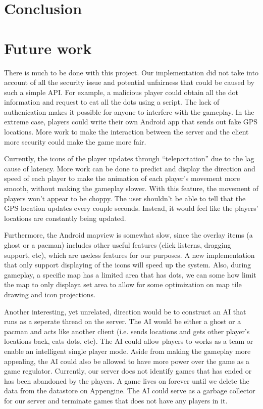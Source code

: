 \documentclass{acm_proc_article-sp}
\begin{document}
\section{Conclusion}

\section{Future work}

There is much to be done with this project. Our implementation did not
take into account of all the security issue and potential unfairness
that could be caused by such a simple API. For example, a malicious
player could obtain all the dot information and request to eat all the
dots using a script. The lack of authenication makes it possible for
anyone to interfere with the gameplay. In the extreme case, players
could write their own Android app that sends out fake GPS
locations. More work to make the interaction between the server and
the client more security could make the game more fair.

Currently, the icons of the player updates through ``teleportation''
due to the lag cause of latency. More work can be done to predict and
display the direction and speed of each player to make the animation
of each player's movement more smooth, without making the gameplay
slower. With this feature, the movement of players won't appear to be
choppy. The user shouldn't be able to tell that the GPS location
updates every couple seconds. Instead, it would feel like the players'
locations are constantly being updated.

Furthermore, the Android mapview is somewhat slow, since the overlay
items (a ghost or a pacman) includes other useful features (click
listerns, dragging support, etc), which are useless features for our
purposes. A new implementation that only support displaying of the
icons will speed up the system. Also, during gameplay, a specific map
has a limited area that has dots, we can some how limit the map to
only displaya set area to allow for some optimization on map tile
drawing and icon projections.

Another interesting, yet unrelated, direction would be to construct an
AI that runs as a seperate thread on the server. The AI would be
either a ghost or a pacman and acts like another client (i.e. sends
locations and gets other player's locations back, eats dots, etc). The
AI could allow players to works as a team or enable an intelligent
single player mode. Aside from making the gameplay more appealing, the
AI could also be allowed to have more power over the game as a game
regulator. Currently, our server does not identify games that has
ended or has been abandoned by the players. A game lives on forever
until we delete the data from the datastore on Appengine. The AI could
serve as a garbage collector for our server and terminate games that
does not have any players in it.
\end{document}

